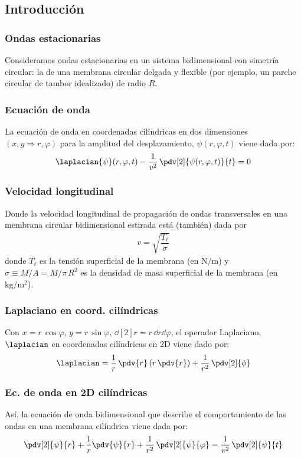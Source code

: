 \subsection{Introducción}
\begin{frame}
\frametitle{Ondas estacionarias}
Consideramos ondas estacionarias en un sistema bidimensional con simetría circular: la de una membrana circular delgada y flexible (por ejemplo, un parche circular de tambor idealizado) de radio $R$.
\end{frame}
\begin{frame}
\frametitle{Ecuación de onda}
La ecuación de onda en coordenadas cilíndricas en dos dimensiones $(x , y \Rightarrow r, \varphi)$ para la amplitud del desplazamiento, $\psi (r, \varphi, t)$ viene dada por:
\begin{align*}
\laplacian{\psi} (r, \varphi, t) - \dfrac{1}{v^{2}} \, \pdv[2]{\psi (r, \varphi, t)}{t} = 0
\end{align*}
\end{frame}
\begin{frame}
\frametitle{Velocidad longitudinal}
Donde la velocidad longitudinal de propagación de ondas transversales en una membrana circular bidimensional estirada está (también) dada por 
\begin{align*}
v = \sqrt{\dfrac{T_{\ell}}{\sigma}}
\end{align*}
donde $T_{\ell}$ es la tensión superficial de la membrana (en $\si{\newton\per\metre}$) y $\sigma \equiv M/A = M / \pi \, R^{2}$ es la densidad de masa superficial de la membrana (en $\si{\kilo\gram\per\square\metre}$).
\end{frame}
\begin{frame}
\frametitle{Laplaciano en coord. cilíndricas}
Con $x = r \, \cos \varphi$, $y = r \, \sin \varphi$, $\dd[2]{r} = r \, \dd{r} \dd{\varphi}$, el operador Laplaciano, $\laplacian$ en coordenadas cilíndricas en 2D viene dado por:
\begin{align*}
\laplacian = \dfrac{1}{r} \, \pdv{r} \left( r \, \pdv{r} \right) + \dfrac{1}{r^{2}} \, \pdv[2]{\phi}
\end{align*}
\end{frame}
\begin{frame}
\frametitle{Ec. de onda en 2D cilíndricas}
Así, la ecuación de onda bidimensional que describe el comportamiento de las ondas en una membrana cilíndrica viene dada por:
\begin{align*}
\pdv[2]{\psi}{r} + \dfrac{1}{r} \pdv{\psi}{r} + \dfrac{1}{r^{2}} \, \pdv[2]{\psi}{\varphi} = \dfrac{1}{v^{2}} \, \pdv[2]{\psi}{t}
\end{align*}
\end{frame}
